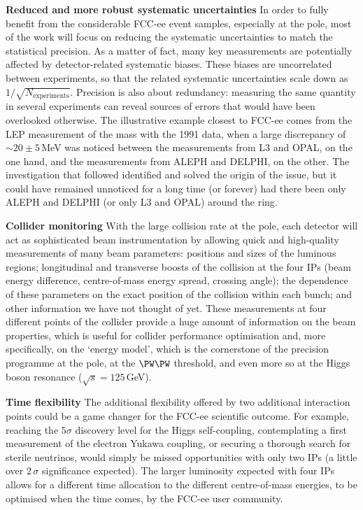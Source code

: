 \begin{tcolorbox}[colback=green!5!white,
                  colframe=green!75!black,
                  title=The benefits of four interaction points
                 ]
{\bf Reduced and more robust systematic uncertainties} 
In order to fully benefit from the considerable FCC-ee event samples, especially at the \PZ pole, most of the work will focus on reducing the systematic uncertainties to match the statistical precision. 
As a matter of fact, many key measurements are potentially affected by detector-related systematic biases. 
These biases are uncorrelated between experiments, so that the related systematic uncertainties scale down as $1/\sqrt{N_\text{experiments}}$. 
Precision is also about redundancy: measuring the same quantity in several experiments can reveal sources of errors that would have been overlooked otherwise. 
The illustrative example closest to FCC-ee comes from the LEP measurement of the \PZ mass with the 1991 data, when a large discrepancy of $\sim 20 \pm 5$\,MeV was noticed between the measurements from L3 and OPAL, on the one hand, and the measurements from ALEPH and DELPHI, on the other. 
The investigation that followed identified and solved the origin of the issue, but it could have remained unnoticed for a long time (or forever) had there been only ALEPH and DELPHI (or only L3 and OPAL) around the ring.

{\bf Collider monitoring} 
With the large collision rate at the \PZ pole, each detector will act as sophisticated beam instrumentation by allowing quick and high-quality measurements of many beam parameters: positions and sizes of the luminous regions; longitudinal and transverse boosts of the collision at the four IPs (beam energy difference, centre-of-mass energy spread, crossing angle); the dependence of these parameters on the exact position of the collision within each bunch; and other information we have not thought of yet. 
These measurements at four different points of the collider provide a huge amount of information on the beam properties, which is useful for collider performance optimisation and, more specifically, on the `energy model', which is the cornerstone of the precision programme at the \PZ pole, at the $\PW\PW$ threshold, and even more so at the Higgs boson resonance ($\sqrt{s} = 125$\,GeV).   

{\bf Time flexibility} 
The additional flexibility offered by two additional interaction points could be a game changer for the FCC-ee scientific outcome. 
For example, reaching the $5\sigma$ discovery level for the Higgs self-coupling, contemplating a first measurement of the electron Yukawa coupling, or securing a thorough search for sterile neutrinos, would simply be missed opportunities with only two IPs (a little over 2\,$\sigma$ significance expected).
The larger luminosity expected with four IPs allows for a different time allocation to the different centre-of-mass energies, to be optimised when the time comes, by the FCC-ee user community.


\end{tcolorbox}
